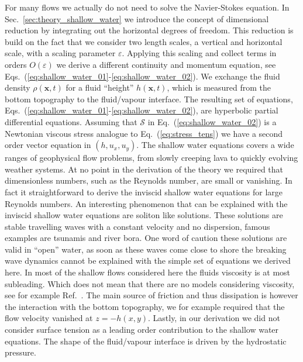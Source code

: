 For many flows we actually do not need to solve the Navier-Stokes equation.
In Sec.~\ref{sec:theory_shallow_water} we introduce the concept of dimensional reduction by integrating out the horizontal degrees of freedom.
This reduction is build on the fact that we consider two length scales, a vertical and horizontal scale, with a scaling parameter $\varepsilon$. 
Applying this scaling and collect terms in orders $O(\varepsilon)$ we derive a different continuity and momentum equation, see Eqs.~(\ref{eq:shallow_water_01}-\ref{eq:shallow_water_02}).
We exchange the fluid density $\rho(\mathbf{x},t)$ for a fluid ``height'' $h(\mathbf{x},t)$, which is measured from the bottom topography to the fluid/vapour interface.
The resulting set of equations, Eqs.~(\ref{eq:shallow_water_01}-\ref{eq:shallow_water_02}), are hyperbolic partial differential equations.
Assuming that $\mathcal{S}$ in Eq.~(\ref{eq:shallow_water_02}) is a Newtonian viscous stress analogue to Eq.~(\ref{eq:stress_tens}) we have a second order vector equation in $(h, u_x, u_y)$.  
The shallow water equations covers a wide ranges of geophysical flow problems, from slowly creeping lava to quickly evolving weather systems.
At no point in the derivation of the theory we required that dimensionless numbers, such as the Reynolds number, are small or vanishing. 
In fact it straightforward to derive the inviscid shallow water equations for large Reynolds numbers. 
An interesting phenomenon that can be explained with the inviscid shallow water equations are soliton like solutions.
These solutions are stable travelling waves with a constant velocity and no dispersion, famous examples are tsunamis and river bora.
One word of caution these solutions are valid in ``open'' water, as soon as these waves come close to shore the breaking wave dynamics cannot be explained with the simple set of equations we derived here. 
In most of the shallow flows considered here the fluids viscosity is at most subleading.
Which does not mean that there are no models considering viscosity, see for example Ref.~\cite{marcheDerivationNewTwodimensional2007}.
The main source of friction and thus dissipation is however the interaction with the bottom topography, we for example required that the flow velocity vanished at $z = -h(x,y)$.
Lastly, in our derivation we did not consider surface tension as a leading order contribution to the shallow water equations.
The shape of the fluid/vapour interface is driven by the hydrostatic pressure.

